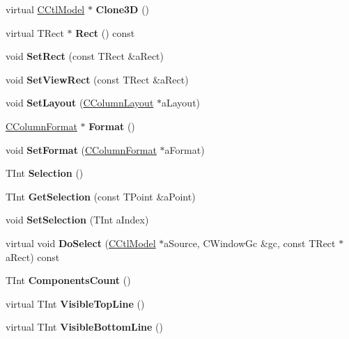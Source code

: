 \begin{DoxyCompactItemize}
virtual \hyperlink{classCCtlModel}{C\+Ctl\+Model} $\ast$ {\bfseries Clone3D} ()
\item 
\mbox{\label{classCCtlColumn_a2e495e9cc31e46a69b2b50385dce3a41}} 
virtual T\+Rect $\ast$ {\bfseries Rect} () const
\item 
\mbox{\label{classCCtlColumn_a9dbfc8e92af000b797616c19ca28215d}} 
void {\bfseries Set\+Rect} (const T\+Rect \&a\+Rect)
\item 
\mbox{\label{classCCtlColumn_a7c95cd8f2de20cd9b2ee0790fe0697ac}} 
void {\bfseries Set\+View\+Rect} (const T\+Rect \&a\+Rect)
\item 
\mbox{\label{classCCtlColumn_a73b42fcf69b77e1846f2758c1ab628f5}} 
void {\bfseries Set\+Layout} (\hyperlink{classCColumnLayout}{C\+Column\+Layout} $\ast$a\+Layout)
\item 
\mbox{\label{classCCtlColumn_a193abd36446de5d62c98371ca32a3ef8}} 
\hyperlink{classCColumnFormat}{C\+Column\+Format} $\ast$ {\bfseries Format} ()
\item 
\mbox{\label{classCCtlColumn_a30b63b99ec2facdc20b7f5fc1dfce206}} 
void {\bfseries Set\+Format} (\hyperlink{classCColumnFormat}{C\+Column\+Format} $\ast$a\+Format)
\item 
\mbox{\label{classCCtlColumn_a2049d52d628f7bf397590598f0b2487b}} 
T\+Int {\bfseries Selection} ()
\item 
\mbox{\label{classCCtlColumn_ad61bf3caf2b89472e73f38ddcb31b492}} 
T\+Int {\bfseries Get\+Selection} (const T\+Point \&a\+Point)
\item 
\mbox{\label{classCCtlColumn_a29de877103fc2ad3c3beb260339f506b}} 
void {\bfseries Set\+Selection} (T\+Int a\+Index)
\item 
\mbox{\label{classCCtlColumn_a8d489581a0a3611eabaa8b91ea3490d4}} 
virtual void {\bfseries Do\+Select} (\hyperlink{classCCtlModel}{C\+Ctl\+Model} $\ast$a\+Source, C\+Window\+Gc \&gc, const T\+Rect $\ast$a\+Rect) const
\item 
\mbox{\label{classCCtlColumn_a9b212e5aac3197c793e9603991e0718d}} 
T\+Int {\bfseries Components\+Count} ()
\item 
\mbox{\label{classCCtlColumn_aab6e1ffad97860cd859a739f90ec2cec}} 
virtual T\+Int {\bfseries Visible\+Top\+Line} ()
\item 
\mbox{\label{classCCtlColumn_affcbebd8b7280a8862d7eecfcd9ff4c1}} 
virtual T\+Int {\bfseries Visible\+Bottom\+Line} ()
\end{DoxyCompactItemize}
